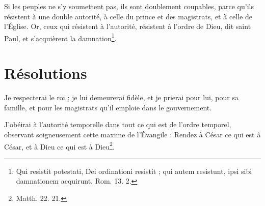 \documentclass[instructions.tex]{subfiles}
\begin{document}
Si les peuples ne s'y soumettent pas, ils sont doublement coupables, parce qu'ils résistent à une double autorité, à celle du prince et des magistrats, et à celle de l'Église. Or, ceux qui résistent à l'autorité, résistent à l'ordre de Dieu, dit saint Paul, et s'acquièrent la damnation\footnote{Qui resistit potestati, Dei ordinationi resistit ; qui autem resistunt, ipsi sibi damnationem acquirunt. Rom. 13. 2.}.
 
\section{Résolutions}
 
\primo Je respecterai le roi ; je lui demeurerai fidèle, et je prierai pour lui, pour sa famille, et pour les magistrats qu'il emploie dans le gouvernement.
 
\secundo J'obéirai à l'autorité temporelle dans tout ce qui est de l'ordre temporel, observant soigneusement cette maxime de l'Évangile : Rendez à César ce qui est à César, et à Dieu ce qui est à Dieu\footnote{Matth. 22. 21.}. 

 
\end{document}
